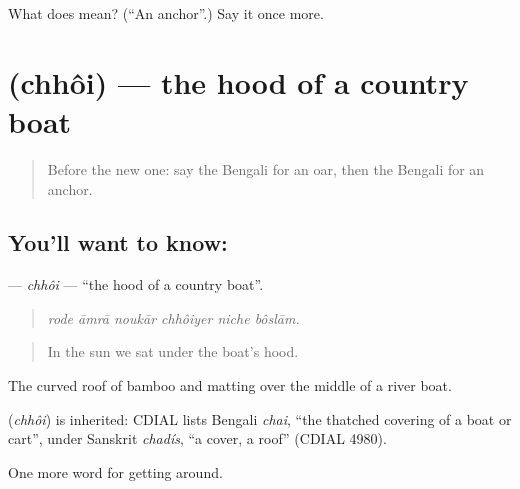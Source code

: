 \begin{tcolorbox}[breakable,colback=teal!4,colframe=teal!35!black,title={Before you move on}]
What does  mean? (\textquotedblleft{}An anchor\textquotedblright{}.) Say it once more.
\end{tcolorbox}
\section[\texorpdfstring{\bn{ছই} (chhôi)}{ছই (chhôi)}]{ (chhôi) — the hood of a country boat}

\label{lesson:BN-C396-chhoi}



\begin{quote}
Before the new one: say the Bengali for an oar, then the Bengali for an anchor.
\end{quote}

\subsection*{You'll want to know: }
\textbf{} — \emph{chhôi} — \textquotedblleft{}the hood of a country boat\textquotedblright{}.

\begin{quote}
     
\end{quote}

\begin{quote}
\emph{rode āmrā noukār chhôiyer niche bôslām.}
\end{quote}

\begin{quote}
In the sun we sat under the boat's hood.
\end{quote}

The curved roof of bamboo and matting over the middle of a river boat.

\begin{cousinweb}
\textbf{} (\emph{chhôi}) is inherited: CDIAL lists Bengali \emph{chai}, \textquotedblleft{}the thatched covering of a boat or cart\textquotedblright{}, under Sanskrit \emph{chadís}, \textquotedblleft{}a cover, a roof\textquotedblright{} (CDIAL 4980).
\end{cousinweb}

\begin{grammarlens}[title={What you've built}]
One more word for getting around.
\end{grammarlens}

